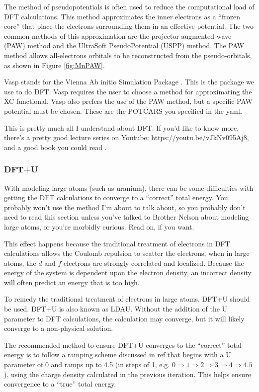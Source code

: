 \documentclass{article}
\begin{document}
The method of pseudopotentials is often used to reduce the
computational load of DFT calculations. This method approximates the
inner electrons as a ``frozen core'' that place the electrons
surrounding them in an effective potential. The two common methods of
this approximation are the projector augmented-wave (PAW) method and
the UltraSoft PseudoPotential (USPP) method. The PAW method allows
all-electrons orbitals to be reconstructed from the pseudo-orbitals,
as shown in Figure \ref{fig:MnPAW}. 

Vasp stands for the Vienna Ab initio Simulation Package
\cite{kresse1996software}. This is the package we use to do DFT. Vasp
requires the user to choose a method for approximating the XC
functional. Vasp also prefers the use of the PAW method, but a
specific PAW potential must be chosen. These are the POTCARS you
specified in the yaml.

This is pretty much all I understand about DFT. If you'd like to know
more, there's a pretty good lecture series on Youtube:
https://youtu.be/vJkNv095Aj8, and a good book you could read
\cite{kitchin2008modeling}. 


\subsubsection{DFT+U}

With modeling large atoms (such as uranium), there can be some
difficulties with getting the DFT calculations to converge to a
``correct'' total energy. You probably won't use the method I'm about
to talk about, so you probably don't need to read this section unless
you've talked to Brother Nelson about modeling large atoms, or you're
morbidly curious. Read on, if you want.

This effect happens because the traditional treatment of electrons in
DFT calculations allows the Coulomb repulsion to scatter the
electrons, when in large atoms, the $d$ and $f$ electrons are strongly
correlated and localized. Because the energy of the system is
dependent upon the electron density, an incorrect density will often
predict an energy that is too high. 
 
To remedy the traditional treatment of electrons in large atoms, DFT+U
should be used. DFT+U is also known as LDAU. Without the addition of
the U parameter to DFT calculations, the calculation may converge,
but it will likely converge to a non-physical solution. 

The recommended method to ensure DFT+U converges to the
``correct'' total energy is to follow a ramping scheme discussed in ref
\cite{meredig2010method} that begins with a U parameter of 0 and ramps
up to 4.5 (in steps of 1, e.g. $0\Rightarrow 1\Rightarrow 2\Rightarrow
3\Rightarrow 4\Rightarrow 4.5$), using the charge density calculated in
the previous iteration. This helps ensure convergence to a ``true''
total energy. 
\end{document}
